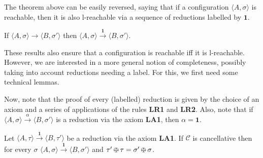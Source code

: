 \documentclass{llncs}
\def\1{{\mathbf 1}}
\def\C{{\mathcal C}}
\newcommand{\comment}[1]{}
\def\monid{{\mathbf 0}}
\def\1{{\mathbf 1}}
\def\C{{\mathcal C}}
\def\odiv{\, {\ominus\hspace{-7.7pt} \div} \,}
\def\monid{\mathbf{1}}
\begin{document}
The theorem above can be easily reversed, saying that if a configuration $\langle A, \sigma \rangle$ is reachable,
then it is also l-reachable via a sequence of reductions labelled by $\monid$.

\begin{proposition}
\label{idred}
If %
$\langle A, \sigma \rangle \to \langle B, \sigma' \rangle$
then %
$\langle A, \sigma \rangle \xrightarrow{\monid}  \langle B, \sigma' \rangle$.
\end{proposition}


	
These results also ensure that a configuration is reachable iff it is l-reachable.
%
However, we are interested in a more general notion of completeness, possibly taking into account 
reductions needing a label. For this, we first need some technical lemmas.
%
\comment{
\begin{lemma}
\label{minor}
Let $\langle A, \tau \rangle$ be a reachable configuration such that
$\sigma \leq \tau$. If $\C$ is invertible then $\langle A, \sigma \rangle$ is a reachable configuration.
%
Moreover, if  $\langle A, \tau \rangle \to \langle B, \tau' \rangle$ then
$\langle A, \sigma \rangle \to \langle B', \sigma' \rangle$ 
with $\sigma' = \tau' \otimes (\sigma \odiv \tau)$.
Furthermore, if $\C$ is also cancellative then $B = B'$.
\end{lemma}
}
%

Now, note that the proof of every (labelled) reduction is given by the choice of an axiom 
and a series of applications of the rules {\bf LR1} and  {\bf LR2}.
Also, note that if 
$\langle A, \sigma \rangle \xrightarrow{\alpha} \langle B, \sigma' \rangle$ is a reduction 
via the axiom {\bf LA1}, then $\alpha = \1$.

\begin{lemma}[Completeness, I]
\label{LA1}
Let $\langle A, \tau \rangle \xrightarrow{\monid} \langle B, \tau' \rangle$ be a reduction 
via the axiom {\bf LA1}. 
If $\C$ is cancellative then 
for every $\sigma$
$\langle A, \sigma \rangle \xrightarrow{\monid} \langle B, \sigma' \rangle$
and $\tau' \odiv \tau = \sigma' \odiv \sigma$.
\end{lemma}


\comment{
\begin{lemma}
\label{riminor}
Let $\langle A, \tau \rangle \xrightarrow{\beta} \langle B, \tau' \rangle$ with $\alpha \leq \beta$. 
%
If $\beta \neq \monid$ then $\langle A, \tau \rangle \xrightarrow{\alpha} \langle B, \tau' \otimes (\alpha \odiv \beta) \rangle$.
\end{lemma}

\todo{questo lemma ora serve?}
The lemma just states that the label in a reduction can always be strengthened,
as long as rule  {\bf LA1} is not used in the reduction labelled by $\beta$.
The proof exploits the premise of rule {\bf LA2} together with Lemma~\ref{l-mono},
and the condition $\beta \neq \monid$ is required in the inductive step for rule  {\bf LR2}.
}
\end{document}
